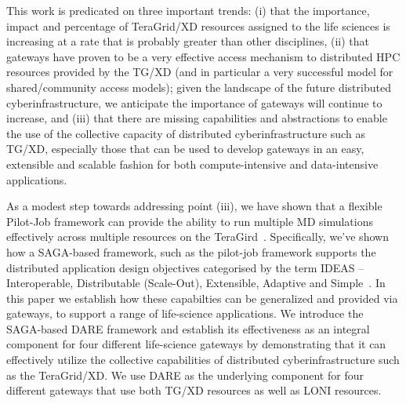 \documentclass{sig-alternate}
\begin{document}
This work is predicated on three important trends: (i) that the
importance, impact and percentage of TeraGrid/XD resources assigned to
the life sciences is increasing at a rate that is probably greater
than other disciplines, (ii) that gateways have proven to be a very
effective access mechanism to distributed HPC resources provided by
the TG/XD (and in particular a very successful model for
shared/community access models); given the landscape of the future
distributed cyberinfrastructure, we anticipate the importance of
gateways will continue to increase, and (iii) that there are missing
capabilities and abstractions to enable the use of the collective
capacity of distributed cyberinfrastructure such as TG/XD, especially
those that can be used to develop gateways in an easy, extensible and
scalable fashion for both compute-intensive and data-intensive
applications.

As a modest step towards addressing point (iii), we have shown that a
flexible Pilot-Job framework can provide the ability to run multiple
MD simulations effectively across multiple resources on the
TeraGird~\cite{saga-royalsoc, saga-ccgrid10}. Specifically, we've
shown how a SAGA-based framework, such as the pilot-job framework
supports the distributed application design objectives categorised by
the term IDEAS -- Interoperable, Distributable (Scale-Out),
Extensible, Adaptive and Simple~\cite{ideas}.  In this paper we
establish how these capabilties can be generalized and provided via
gateways, to support a range of life-science applications.  We
introduce the SAGA-based DARE framework and establish its
effectiveness as an integral component for four different life-science
gateways by demonstrating that it can effectively utilize the
collective capabilities of distributed cyberinfrastructure such as the
TeraGrid/XD. We use DARE as the underlying component for four
different gateways that use both TG/XD resources as well as LONI
resources.
\end{document}
